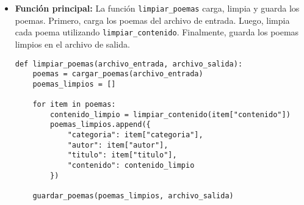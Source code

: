 \begin{itemize}
    \item \textbf{Función principal:} La función \texttt{limpiar\_poemas} carga, limpia y guarda los poemas. Primero, carga los poemas del archivo de entrada. Luego, limpia cada poema utilizando \texttt{limpiar\_contenido}. Finalmente, guarda los poemas limpios en el archivo de salida.
    
    \begin{verbatim}
def limpiar_poemas(archivo_entrada, archivo_salida):
    poemas = cargar_poemas(archivo_entrada)
    poemas_limpios = []

    for item in poemas:
        contenido_limpio = limpiar_contenido(item["contenido"])
        poemas_limpios.append({
            "categoria": item["categoria"],
            "autor": item["autor"],
            "titulo": item["titulo"],
            "contenido": contenido_limpio
        })

    guardar_poemas(poemas_limpios, archivo_salida)
    \end{verbatim}

\end{itemize}
